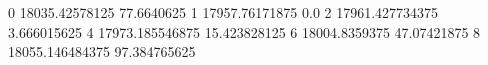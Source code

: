 0 18035.42578125 77.6640625
1 17957.76171875 0.0
2 17961.427734375 3.666015625
4 17973.185546875 15.423828125
6 18004.8359375 47.07421875
8 18055.146484375 97.384765625
